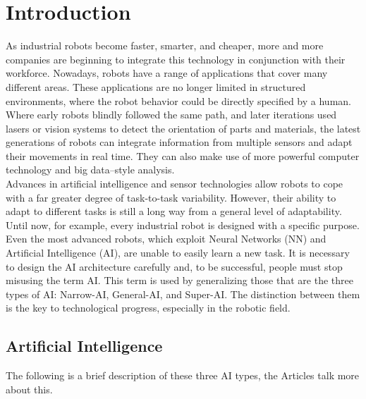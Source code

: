
\chapter{Introduction} \label{cha:introduction}

As industrial robots become faster, smarter, and cheaper, more and more companies are beginning to integrate this technology in conjunction with their workforce. 
Nowadays, robots have a range of applications that cover many different areas. These applications are no longer limited in structured environments, where the robot behavior could be directly specified by a human.
Where early robots blindly followed the same path, and later iterations used lasers or vision systems to detect the orientation of parts and materials, the latest generations of robots can integrate information from multiple sensors and adapt their movements in real time. They can also make use of more powerful computer technology and big data–style analysis. \\
Advances in artificial intelligence and sensor technologies allow robots to cope with a far greater degree of task-to-task variability. However, their ability to adapt to different tasks is still a long way from a general level of adaptability. 
Until now, for example, every industrial robot is designed with a specific purpose. Even the most advanced robots, which exploit Neural Networks (NN) and Artificial Intelligence (AI), are unable to easily learn a new task.
It is necessary to design the AI architecture carefully and, to be successful, people must stop misusing the term AI. This term is used by generalizing those that are the three types of AI: Narrow-AI, General-AI, and Super-AI. The distinction between them is the key to technological progress, especially in the robotic field. 


\section{Artificial Intelligence}\label{sec:ai}

The following is a brief description of these three AI types, the Articles \cite{davidson_2019, edi_weekly, lawtomated_2020, allan_2018, astute_solutions_2020} talk more about this. 

